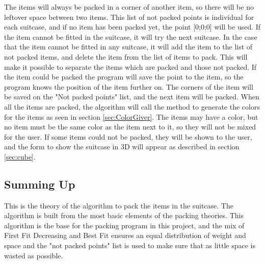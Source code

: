 The items will always be packed in a corner of another item, so there will be no leftover space between two items. This list of not packed points is individual for each suitcase, and if no item has been packed yet, the point [0;0;0] will be used. If the item cannot be fitted in the suitcase, it will try the next suitcase. In the case that the item cannot be fitted in any suitcase, it will add the item to the list of not packed items, and delete the item from the list of items to pack. This will make it possible to separate the items which are packed and those not packed. If the item could be packed the program will save the point to the item, so the program knows the position of the item further on. The corners of the item will be saved on the "Not packed points" list, and the next item will be packed.
When all the items are packed, the algorithm will call the method to generate the colors for the items as seen in section \ref{sec:ColorGiver}. The items may have a color, but no item must be the same color as the item next to it, so they will not be mixed for the user. If some items could not be packed, they will be shown to the user, and the form to show the suitcase in 3D will appear as described in section \ref{sec:cube}.

\subsection{Summing Up}
This is the theory of the algorithm to pack the items in the suitcase. The algorithm is built from the most basic elements of the packing theories. This algorithm is the base for the packing program in this project, and the mix of First Fit Decreasing and Best Fit ensures an equal distribution of weight and space and the "not packed points" list is used to make sure that as little space is wasted as possible.
